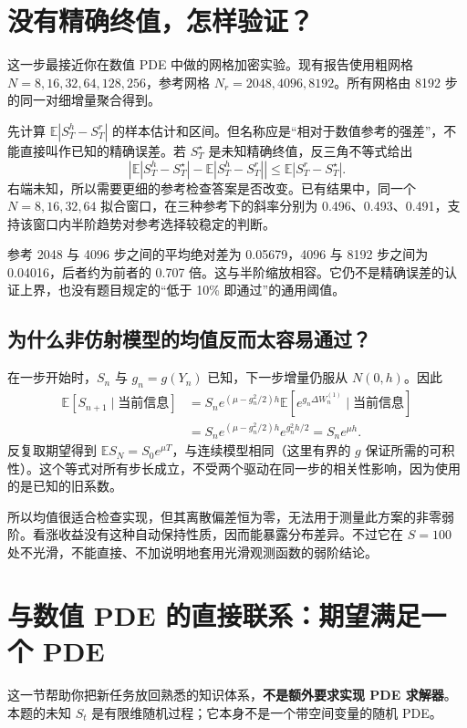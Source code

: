 \documentclass[11pt,a4paper,fontset=none]{ctexart}
\newcommand{\E}{\mathbb E}
\begin{document}
\newpage
\section{没有精确终值，怎样验证？}
这一步最接近你在数值 PDE 中做的网格加密实验。现有报告使用粗网格 $N=8,16,32,64,128,256$，参考网格 $N_r=2048,4096,8192$。所有网格由 8192 步的同一对细增量聚合得到。

先计算 $\E|S_T^h-S_T^r|$ 的样本估计和区间。但名称应是“相对于数值参考的强差”，不能直接叫作已知的精确误差。若 $S_T^\star$ 是未知精确终值，反三角不等式给出
\[
\left|\E|S_T^h-S_T^\star|-\E|S_T^h-S_T^r|\right|
\leq\E|S_T^r-S_T^\star|.
\]
右端未知，所以需要更细的参考检查答案是否改变。已有结果中，同一个 $N=8,16,32,64$ 拟合窗口，在三种参考下的斜率分别为 0.496、0.493、0.491，支持该窗口内半阶趋势对参考选择较稳定的判断。

参考 2048 与 4096 步之间的平均绝对差为 0.05679，4096 与 8192 步之间为 0.04016，后者约为前者的 0.707 倍。这与半阶缩放相容。它仍不是精确误差的认证上界，也没有题目规定的“低于 10\% 即通过”的通用阈值。

\subsection*{为什么非仿射模型的均值反而太容易通过？}
在一步开始时，$S_n$ 与 $g_n=g(Y_n)$ 已知，下一步增量仍服从 $N(0,h)$。因此
\begin{align*}
\E[S_{n+1}\mid\text{当前信息}]
&=S_ne^{(\mu-g_n^2/2)h}\E[e^{g_n\Delta W_n^{(1)}}\mid\text{当前信息}]\\
&=S_ne^{(\mu-g_n^2/2)h}e^{g_n^2h/2}=S_ne^{\mu h}.
\end{align*}
反复取期望得到 $\E S_N=S_0e^{\mu T}$，与连续模型相同（这里有界的 $g$ 保证所需的可积性）。这个等式对所有步长成立，不受两个驱动在同一步的相关性影响，因为使用的是已知的旧系数。

所以均值很适合检查实现，但其离散偏差恒为零，无法用于测量此方案的非零弱阶。看涨收益没有这种自动保持性质，因而能暴露分布差异。不过它在 $S=100$ 处不光滑，不能直接、不加说明地套用光滑观测函数的弱阶结论。

\newpage
\section{与数值 PDE 的直接联系：期望满足一个 PDE}\label{sec:pde}
这一节帮助你把新任务放回熟悉的知识体系，\textbf{不是额外要求实现 PDE 求解器}。本题的未知 $S_t$ 是有限维随机过程；它本身不是一个带空间变量的随机 PDE。
\end{document}
